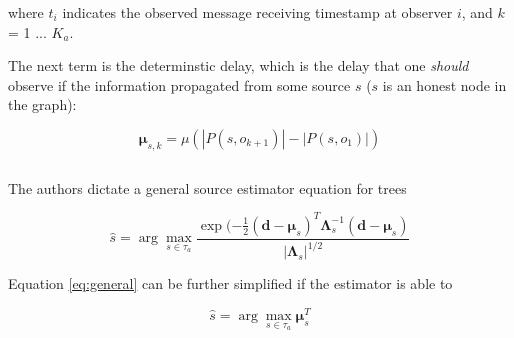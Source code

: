where $t_i$ indicates the observed message receiving timestamp at observer $i$, and $k$ = 1 ... $K_a$.

The next term is the determinstic delay, which is the delay that one \emph{should} observe if the information propagated from some source $s$ ($s$ is an honest node in the graph):

\begin{equation}
\boldsymbol{\mu}_{s,k} = \mu (|P(s, o_{k+1})| - |P(s, o_1)|)
\end{equation}


\begin{equation}
\end{equation}


The authors dictate a general source estimator equation for trees 

\begin{equation}
\label{eq:general}
\hat{s} = \arg\max_{s \in \tau_{a}} \dfrac{\exp(-\frac{1}{2} (\boldsymbol{d} - \boldsymbol{\mu}_{s})^{T} \boldsymbol{\Lambda}_s^{-1} (\boldsymbol{d} - \boldsymbol{\mu}_s) }{|\boldsymbol{\Lambda}_s|^{1/2}}
\end{equation}

Equation \ref{eq:general} can be further simplified if the estimator is able to 

\begin{equation}
\label{eq:tree}
\hat{s} = \arg\max_{s \in \tau_{a}} \boldsymbol{\mu}_{s}^{T}
\end{equation}
